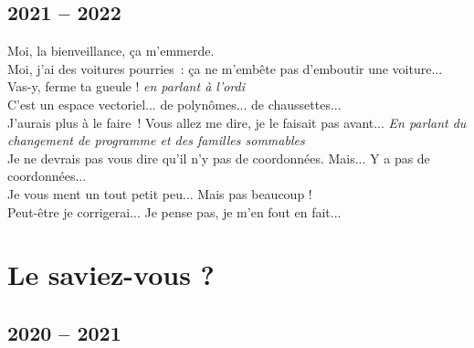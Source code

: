 \documentclass[french, a4paper, openany]{book}
\begin{document}
\section{2021 -- 2022}

	\noindent \og Moi, la bienveillance, ça m'emmerde. \fg \\
	\og Moi, j'ai des voitures pourries~: ça ne m'embête pas d'emboutir une voiture... \fg \\
	\og Vas-y, ferme ta gueule ! \fg \emph{en parlant à l'ordi} \\
	\og C'est un espace vectoriel... de polynômes... de chaussettes... \fg \\
	\og J'aurais plus à le faire~! Vous allez me dire, je le faisait pas avant... \fg \emph{En parlant du changement de programme et des familles sommables} \\
	\og Je ne devrais pas vous dire qu'il n'y pas de coordonnées. Mais... Y a pas de coordonnées... \fg \\
	\og Je vous ment un tout petit peu... Mais pas beaucoup ! \fg \\
	\og Peut-être je corrigerai... Je pense pas, je m'en fout en fait... \fg \\

\chapter{Le saviez-vous ?}

\section{2020 -- 2021}
\end{document}
